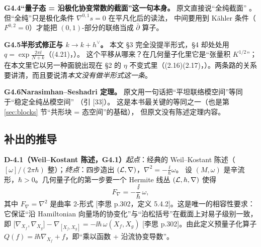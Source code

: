 \medskip
\noindent\textbf{G4.4}\quad \textbf{“量子态 = 沿极化协变常数的截面”这一句本身。}
原文直接说“全纯截面” 。但“全纯”只是极化条件 $\nabla^{0,1}s=0$ 在平凡化后的读法，
中间要用到 Kähler 条件（$F^{0,2}=0$）才能把 $(0,1)$-部分的联络当成 $\bar\partial$ 算子。



\medskip
\noindent\textbf{G4.5}\quad \textbf{半形式修正与 $k\to k+h^\vee$。}
本文 §3 完全没提半形式，§4 却处处用 $q=\exp\frac{2\pi\ii}{N+k}$（(4.21)，）。
这个平移从哪来？在几何量子化里它是“张量积 $K^{1/2}$”；在本文里它以另一种面貌出现在 §2 的 $\eta$
不变式里（(2.16)(2.17)，）。两条路的关系要讲清，而且要说清\emph{本文没有做半形式这一条}。



\medskip
\noindent\textbf{G4.6}\quad \textbf{Narasimhan--Seshadri 定理。}
原文用一句话把“平坦联络模空间”等同于“稳定全纯丛模空间” （引 [33]）。
这是本书最关键的等同之一（也是第 \ref{sec:blocks} 节“共形块 = 态空间”的基础），
但原文没有陈述定理内容。


\subsection{补出的推导}

\noindent\textbf{D-4.1（Weil--Kostant 陈述，G4.1）}\quad\emph{起点}：经典的 Weil--Kostant 陈述（$[\omega]/(2\pi\hbar)$ 整）；\emph{终点}：四步造出 $(\mathcal{L},\nabla)$，$\nabla^2=-\frac{\ii}{\hbar}\omega$。
设 $(M,\omega)$ 是辛流形，$\hbar>0$。几何量子化的第一步要一个 Hermite 线丛 $(\mathcal{L},h,\nabla)$
使得
\begin{equation}
F_\nabla=-\frac{\ii}{\hbar}\,\omega ,
\label{eq:ch4-preq}
\end{equation}
其中 $F_\nabla=\nabla^2$ 是曲率 2-形式 [李思 p.302，定义 5.4.2]。这是唯一的相容性要求：
它保证“沿 Hamiltonian 向量场的协变化”与“泊松括号”在截面上对易子级别一致，即
$\bigl[\nabla_{X_f},\nabla_{X_g}\bigr]-\nabla_{[X_f,X_g]}=-\ii\hbar\,\omega(X_f,X_g)$
[李思 p.302]。由此定义预量子化算子 $Q(f)=\ii\hbar\nabla_{X_f}+f$，即“乘以函数 + 沿流协变导数”。

